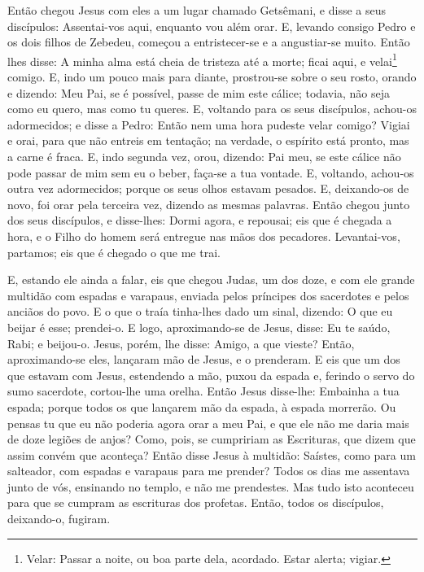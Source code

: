 Então chegou Jesus com eles a um lugar chamado Getsêmani, e disse
a seus discípulos: Assentai-vos aqui, enquanto vou além orar.
E, levando consigo Pedro e os dois filhos de Zebedeu, começou
a entristecer-se e a angustiar-se muito. Então lhes disse: A
minha alma está cheia de tristeza até a morte; ficai aqui, e
velai\footnote{Velar: Passar a noite, ou boa parte dela, acordado.
Estar alerta; vigiar.} comigo. E, indo um pouco mais para
diante, prostrou-se sobre o seu rosto, orando e dizendo: Meu Pai, se
é possível, passe de mim este cálice; todavia, não seja como eu
quero, mas como tu queres. E, voltando para os seus
discípulos, achou-os adormecidos; e disse a Pedro: Então nem uma
hora pudeste velar comigo? Vigiai e orai, para que não
entreis em tentação; na verdade, o espírito está pronto, mas a carne
é fraca. E, indo segunda vez, orou, dizendo: Pai meu, se este
cálice não pode passar de mim sem eu o beber, faça-se a tua vontade.
E, voltando, achou-os outra vez adormecidos; porque os seus
olhos estavam pesados. E, deixando-os de novo, foi orar pela
terceira vez, dizendo as mesmas palavras. Então chegou junto
dos seus discípulos, e disse-lhes: Dormi agora, e repousai; eis que
é chegada a hora, e o Filho do homem será entregue nas mãos dos
pecadores. Levantai-vos, partamos; eis que é chegado o que me
trai.

E, estando ele ainda a falar, eis que chegou Judas, um dos doze,
e com ele grande multidão com espadas e varapaus, enviada pelos
príncipes dos sacerdotes e pelos anciãos do povo. E o que o
traía tinha-lhes dado um sinal, dizendo: O que eu beijar é esse;
prendei-o. E logo, aproximando-se de Jesus, disse: Eu te
saúdo, Rabi; e beijou-o. Jesus, porém, lhe disse: Amigo, a
que vieste? Então, aproximando-se eles, lançaram mão de Jesus, e o
prenderam. E eis que um dos que estavam com Jesus, estendendo
a mão, puxou da espada e, ferindo o servo do sumo sacerdote,
cortou-lhe uma orelha. Então Jesus disse-lhe: Embainha a tua
espada; porque todos os que lançarem mão da espada, à espada
morrerão. Ou pensas tu que eu não poderia agora orar a meu
Pai, e que ele não me daria mais de doze legiões de anjos?
Como, pois, se cumpririam as Escrituras, que dizem que assim
convém que aconteça? Então disse Jesus à multidão: Saístes,
como para um salteador, com espadas e varapaus para me prender?
Todos os dias me assentava junto de vós, ensinando no templo, e não
me prendestes. Mas tudo isto aconteceu para que se cumpram as
escrituras dos profetas. Então, todos os discípulos, deixando-o,
fugiram.

